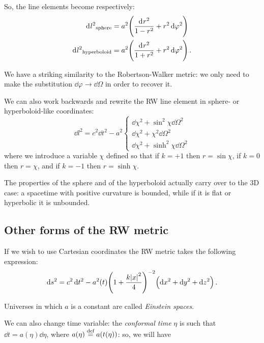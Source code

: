 \documentclass[main.tex]{subfiles}
\begin{document}
So, the line elements become respectively:
\begin{subequations}
\begin{align}
    \dd[]{l^2}_{\text{sphere}} &= a^2 \qty(\frac{\dd[]{r^2}}{1 - r^2}  + r^2 \dd{\varphi^2}  )\\
    \dd[]{l^2}_{\text{hyperboloid}} &= a^2 \qty(\frac{\dd[]{r^2}}{1 + r^2} + r^2 \dd{\varphi^2}  )\,.
\end{align}
\end{subequations}

We have a striking similarity to the Robertson-Walker metric: we only need to make the substitution \(\dd{\varphi } \rightarrow \dd{\Omega }\) in order to recover it.

We can also work backwards and rewrite the RW line element in sphere- or hyperboloid-like coordinates:
\begin{equation}
  \dd{l^2} = c^2 \dd{t^2} - a^2 \begin{cases}
      \dd{\chi^2} + \sin^2 \chi \dd{\Omega^2} \\
      \dd{\chi^2} + \chi^2\dd{\Omega^2} \\
      \dd{\chi^2} + \sinh^2 \chi \dd{\Omega^2}
\end{cases}
\end{equation}
%
where we introduce a variable \(\chi \) defined so that if \(k = +1\) then \(r = \sin \chi\), if \(k=0\)  then \(r=\chi\), and if \(k = -1\) then \(r = \sinh \chi\).

The properties of the sphere and of the hyperboloid actually carry over to the 3D case: a spacetime with positive curvature is bounded, while if it is flat or hyperbolic it is unbounded.

\subsection{Other forms of the RW metric}

If we wish to use Cartesian coordinates the RW metric takes the following expression:
%
\begin{equation}
  \dd{s^2} = c^2 \dd{t^2} - a^2 (t) \qty(1 + \frac{k \abs{x}^2}{4} )^{-2} \qty(\dd{x^2} + \dd{y^2} + \dd{z^2}) \,.
\end{equation}

Universes in which \(a\) is a constant are called \emph{Einstein spaces}.

We can also change time variable: the \emph{conformal time} \(\eta \) is such that \(\dd{t} = a(\eta) \dd{\eta} \), where \(a(\eta) \stackrel{\text{def}}{=} a(t(\eta))\): so, we will have
\end{document}
